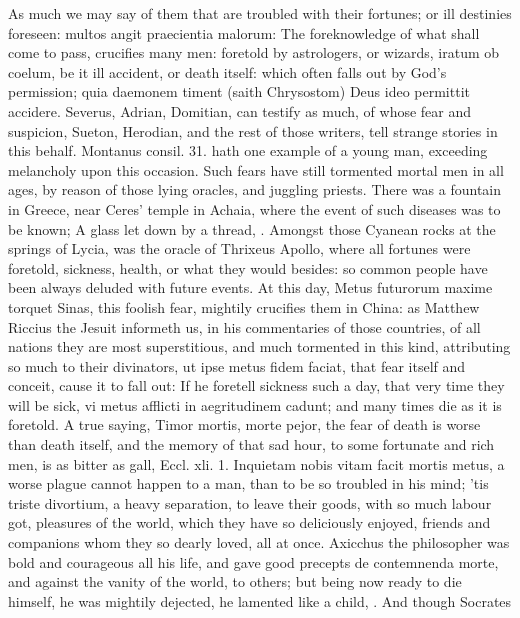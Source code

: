 {As much we may say of them that are troubled with their fortunes; or
ill destinies foreseen: multos angit praecientia malorum: The
foreknowledge of what shall come to pass, crucifies many men: foretold
by astrologers, or wizards, iratum ob coelum, be it ill accident, or
death itself: which often falls out by God's permission; quia daemonem
timent (saith Chrysostom) Deus ideo permittit accidere. Severus,
Adrian, Domitian, can testify as much, of whose fear and suspicion,
Sueton, Herodian, and the rest of those writers, tell strange stories
in this behalf. Montanus consil. 31. hath one example of a young
man, exceeding melancholy upon this occasion. Such fears have still
tormented mortal men in all ages, by reason of those lying oracles, and
juggling priests. There was a fountain in Greece, near Ceres'
temple in Achaia, where the event of such diseases was to be known; A
glass let down by a thread, \etc{}. Amongst those Cyanean rocks at the
springs of Lycia, was the oracle of Thrixeus Apollo, where all fortunes
were foretold, sickness, health, or what they would besides: so common
people have been always deluded with future events. At this day, Metus
futurorum maxime torquet Sinas, this foolish fear, mightily crucifies
them in China: as Matthew Riccius the Jesuit informeth us, in his
commentaries of those countries, of all nations they are most
superstitious, and much tormented in this kind, attributing so much to
their divinators, ut ipse metus fidem faciat, that fear itself and
conceit, cause it to fall out: If he foretell sickness such a
day, that very time they will be sick, vi metus afflicti in
aegritudinem cadunt; and many times die as it is foretold. A true
saying, Timor mortis, morte pejor, the fear of death is worse than
death itself, and the memory of that sad hour, to some fortunate and
rich men, is as bitter as gall, Eccl. xli. 1. Inquietam nobis vitam
facit mortis metus, a worse plague cannot happen to a man, than to be
so troubled in his mind; 'tis triste divortium, a heavy separation, to
leave their goods, with so much labour got, pleasures of the world,
which they have so deliciously enjoyed, friends and companions whom
they so dearly loved, all at once. Axicchus the philosopher was bold
and courageous all his life, and gave good precepts de contemnenda
morte, and against the vanity of the world, to others; but being now
ready to die himself, he was mightily dejected,  he lamented like a child, \etc{}. And though Socrates
}
